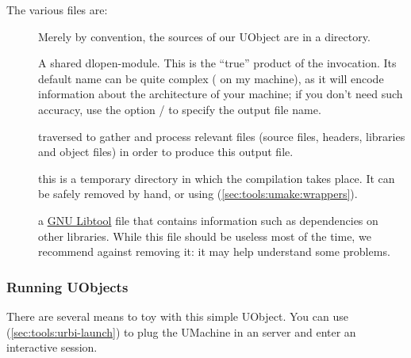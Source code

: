 The various files are:
\begin{description}
\item[] Merely by convention, the sources of our UObject
  are in a  directory.
\item[] A shared dlopen-module.  This is the ``true''
  product of the  invocation.  Its default name can be
  quite complex ( on my machine), as
  it will encode information about the architecture of your machine; if you
  don't need such accuracy, use the option / to
  specify the output file name.

   traversed  to gather and process
  relevant files (source files, headers, libraries and object files) in
  order to produce this output file.

\item[] this is a temporary directory in which the
  compilation takes place.  It can be safely removed by hand, or using
   (\autoref{sec:tools:umake:wrappers}).

\item[] a \href{http://www.gnu.org/software/libtool/}{GNU
    Libtool} file that contains information such as dependencies on other
  libraries.  While this file should be useless most of the time, we
  recommend against removing it: it may help understand some problems.
\end{description}

\subsubsection{Running UObjects}

There are several means to toy with this simple UObject.  You can use
 (\autoref{sec:tools:urbi-launch}) to plug the UMachine
in an \urbi server and enter an interactive session.


